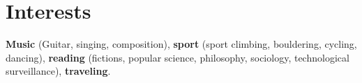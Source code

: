 \documentclass[11pt,a4paper,sans]{moderncv} %
\renewcommand*{\cvitem}[3][.25em]{%
  \ifthenelse{\equal{#2}{}}{}{\hintstyle{#2} }{#3}%
\par\addvspace{#1}}
\begin{document}

\section{Interests}
\textbf{Music} (Guitar, singing, composition), \textbf{sport} (sport climbing, bouldering, cycling, dancing), \textbf{reading} (fictions, popular science, philosophy, sociology, technological surveillance), \textbf{traveling}.

\end{document}
